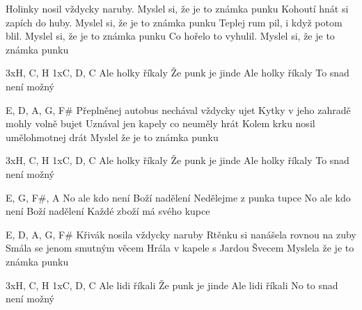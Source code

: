 \resetVars
{}
\MakeHeader
\Lyrics

Holinky nosil vždycky naruby. Myslel si, že je to známka punku
Kohoutí hnát si zapích do huby. Myslel si, že je to známka punku
Teplej rum pil, i když potom blil. Myslel si, že je to známka punku
Co hořelo to vyhulil. Myslel si, že je to známka punku


3xH, C, H 1xC, D, C
Ale holky říkaly
Že punk je jinde
Ale holky říkaly
To snad není možný

E, D, A, G, F\#
Přeplněnej autobus nechával vždycky ujet
Kytky v jeho zahradě mohly volně bujet
Uznával jen kapely co neuměly hrát
Kolem krku nosil umělohmotnej drát
Myslel že je to známka punku

3xH, C, H 1xC, D, C
Ale holky říkaly
Že punk je jinde
Ale holky říkaly
To snad není možný

E, G, F\#, A
No ale kdo není
Boží nadělení
Nedělejme z punka tupce
No ale kdo není
Boží nadělení
Každé zboží má svého kupce

E, D, A, G, F\#
Křivák nosila vždycky naruby
Rtěnku si nanášela rovnou na zuby
Smála se jenom smutným věcem
Hrála v kapele s Jardou Švecem
Myslela že je to známka punku

3xH, C, H 1xC, D, C
Ale lidi říkali
Že punk je jinde
Ale lidi říkali
No to snad není možný

\Next
